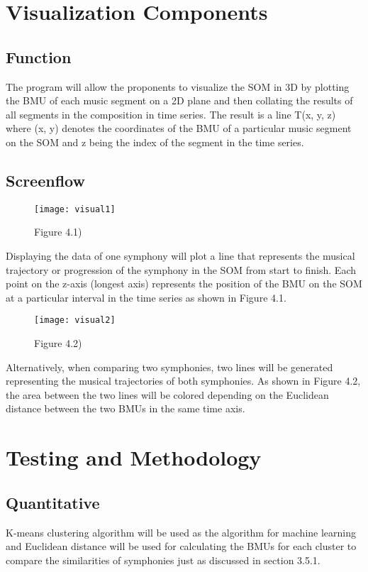 \section{Visualization Components}
\subsection{Function}

The program will allow the proponents to visualize the SOM in 3D by plotting the BMU of each music segment on a 2D plane and then collating the results of all segments in the composition in time series. The result is a line T(x, y, z) where (x, y) denotes the coordinates of the BMU of a particular music segment on the SOM and z being the index of the segment in the time series.

\subsection{Screenflow}

\begin{figure}[h]
\caption{Figure 4.1)}
\centering
\texttt{[image: visual1]}
\end{figure}

Displaying the data of one symphony will plot a line that represents the musical trajectory or progression of the symphony in the SOM from start to finish. Each point on the z-axis (longest axis) represents the position of the BMU on the SOM at a particular interval in the time series as shown in Figure 4.1.

\begin{figure}[h]
\caption{Figure 4.2)}
\centering
\texttt{[image: visual2]}
\end{figure}

Alternatively, when comparing two symphonies, two lines will be generated representing the musical trajectories of both symphonies. As shown in Figure 4.2, the area between the two lines will be colored depending on the Euclidean distance between the two BMUs in the same time axis.

\section{Testing and Methodology}
\subsection{Quantitative}

K-means clustering algorithm will be used as the algorithm for machine learning and Euclidean distance will be used for calculating the BMUs for each cluster to compare the similarities of symphonies just as discussed in section 3.5.1.

